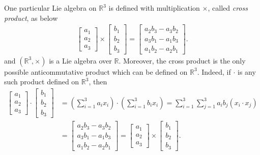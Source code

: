\documentclass[10pt]{book}
\theoremstyle{definition}
\numberwithin{equation}{chapter}
\begin{document}
One particular Lie algebra on $\mathbb{R}^3$ is defined with multiplication $\times$, called \emph{cross product}, as below
\begin{align*}
    \begin{bmatrix}
    a_1 \\
    a_2 \\
    a_3
    \end{bmatrix} \times 
    \begin{bmatrix}
    b_1 \\
    b_2 \\
    b_3
    \end{bmatrix} = 
    \begin{bmatrix}
    a_2 b_3 - a_3 b_2 \\
    a_3 b_1 - a_1 b_3 \\
    a_1 b_2 - a_2 b_1
    \end{bmatrix}.
\end{align*}
and $(\mathbb{R}^3,\times)$ is a Lie algebra over $\mathbb{R}$. Moreover, the cross product is the only possible anticommutative product which can be defined on $\mathbb{R}^3$. Indeed, if $\cdot$ is any such product defined on $\mathbb{R}^3$, then 
\begin{align*}
    \begin{bmatrix}
    a_1 \\
    a_2 \\
    a_3
    \end{bmatrix}\cdot 
    \begin{bmatrix}
    b_1 \\
    b_2 \\
    b_3
    \end{bmatrix} & = \left(\sum^3_{i=1} a_i x_i\right)\cdot \left(\sum^3_{i=1} b_i x_i\right) = \sum^3_{i=1}\sum^3_{j=1} a_i b_j (x_i\cdot x_j)\\
    & = \begin{bmatrix}
    a_2 b_3 - a_3 b_2 \\
    a_3 b_1 - a_1 b_3 \\
    a_1 b_2 - a_2 b_1
    \end{bmatrix} = \begin{bmatrix}
    a_1 \\
    a_2 \\
    a_3
    \end{bmatrix} \times 
    \begin{bmatrix}
    b_1 \\
    b_2 \\
    b_3
    \end{bmatrix}.
\end{align*}
\end{document}
